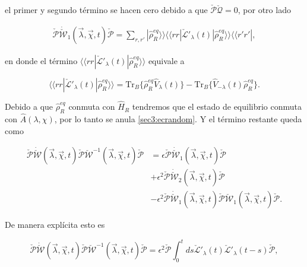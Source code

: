 \begin{appendixs}
el primer y segundo término se hacen cero debido a que $\check{\mathcal{P}}\check{\mathcal{Q}}=0$, por otro lado

\begin{align*}
    \check{\mathcal{P}}\dot{\check{\mathcal{W}}}_{1}(\vec{\lambda},\vec{\chi},t)\check{\mathcal{P}} = \sum_{r,r'}|\hat{\rho}^{eq}_{R} \rangle \rangle \langle \langle rr| \check{\mathcal{L}}'_{\lambda}(t)|\hat{\rho}_{R}^{eq}\rangle \rangle \langle \langle r'r'|,
\end{align*}

en donde el término $\langle \langle rr|\check{\mathcal{L}}'_{\lambda}(t)|\hat{\rho}_{R}^{eq}\rangle \rangle$ equivale a 

\begin{equation}
    \langle \langle rr|\check{\mathcal{L}}'_{\lambda}(t)|\hat{\rho}_{R}^{eq}\rangle \rangle  = \text{Tr}_{B}\{\hat{\rho}^{eq}_{R}\hat{V}_{\lambda}(t)\} - \text{Tr}_{B}\{\hat{V}_{-\lambda}(t)\hat{\rho}^{eq}_{R}\}.
    \label{sec3:ecrandom}
\end{equation}

Debido a que $\hat{\rho}^{eq}_{R}$ conmuta con $\hat{H}_{R}$ tendremos que el estado de equilibrio conmuta con $\hat{A}(\lambda,\chi)$, por lo tanto se anula \ref{sec3:ecrandom}. Y el término restante queda como 

\begin{align*}
    \check{\mathcal{P}}\dot{\check{\mathcal{W}}}(\vec{\lambda},\vec{\chi},t)\check{\mathcal{P}}\check{\mathcal{W}}^{-1}(\vec{\lambda},\vec{\chi},t)\check{\mathcal{P}} & = \epsilon \check{\mathcal{P}}\dot{\check{\mathcal{W}}}_{1}(\vec{\lambda},\vec{\chi},t)\check{\mathcal{P}} \\
    & + \epsilon^{2}\check{\mathcal{P}}\dot{\check{\mathcal{W}}}_{2}(\vec{\lambda},\vec{\chi},t)\check{\mathcal{P}} \\
    & - \epsilon^{2}\check{\mathcal{P}}\dot{\check{\mathcal{W}}}_{1}(\vec{\lambda},\vec{\chi},t)\check{\mathcal{P}}  \check{\mathcal{W}}_{1}(\vec{\lambda},\vec{\chi},t) \check{\mathcal{P}}.
\end{align*}

De manera explícita esto es

\begin{equation*}
    \check{\mathcal{P}}\dot{\check{\mathcal{W}}}(\vec{\lambda},\vec{\chi},t)\check{\mathcal{P}}\check{\mathcal{W}}^{-1}(\vec{\lambda},\vec{\chi},t)\check{\mathcal{P}} = \epsilon^{2}\check{\mathcal{P}}\int_{0}^{t}ds \check{\mathcal{L}}'_{\lambda}(t)\check{\mathcal{L}}'_{\lambda}(t-s)\check{\mathcal{P}}, 
\end{equation*}


\end{appendixs}
